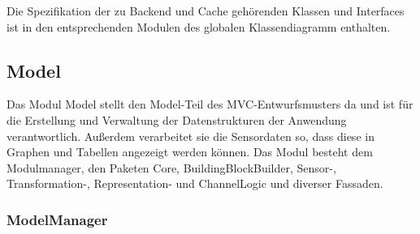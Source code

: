 \documentclass[parskip=full]{scrartcl}
\begin{document}
Die Spezifikation der zu Backend und Cache gehörenden Klassen und Interfaces ist in den entsprechenden Modulen des globalen Klassendiagramm enthalten. 

\clearpage
\subsection{Model}

Das Modul Model stellt den Model-Teil des MVC-Entwurfsmusters da und ist für die Erstellung und Verwaltung der Datenstrukturen der Anwendung verantwortlich. Außerdem verarbeitet sie die Sensordaten so, dass diese in Graphen und Tabellen angezeigt werden können. Das Modul besteht dem Modulmanager, den Paketen Core, BuildingBlockBuilder, Sensor-, Transformation-, Representation- und ChannelLogic und diverser Fassaden.

\subsubsection{ModelManager}
\end{document}
